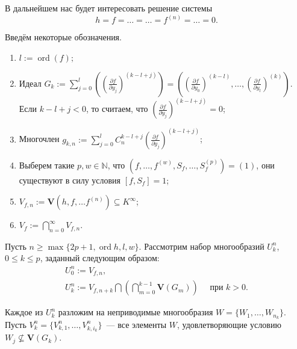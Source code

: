 \documentclass[16pt]{article}
\DeclareMathOperator{\ord}{ord}
\renewcommand{\le}{\leqslant} %
\renewcommand{\ge}{\geqslant} %
\theoremstyle{plain1}
\theoremstyle{plain2}
\theoremstyle{plain}
\theoremstyle{plain3}
\theoremstyle{definition}
\theoremstyle{remark}
\begin{document}
В дальнейшем нас будет интересовать решение системы
\begin{equation}
\label{eq1}
h=f=\ldots=\ldots=f^{(n)}=\ldots=0.
\end{equation}

Введём некоторые обозначения.
\begin{enumerate}

  \item $l:=\ord (f);$

  \item Идеал $G_k := \sum\limits_{j=0}^l\left(\left(\frac{\partial f}{\partial y_j}\right)^{(k-l+j)}\right) = \left(\left(\frac{\partial f}{\partial y_0}\right)^{(k-l)},\ldots ,\left(\frac{\partial f}{\partial y_l}\right)^{(k)} \right)$.
  \\Если $k-l+j<0$, то считаем, что $\left(\frac{\partial f}{\partial y_j}\right)^{(k-l+j)} = 0$;

  \item Многочлен $g_{k,n}:=\sum\limits_{j=0}^{l}C_n^{k-l+j}\left(\frac{\partial f}{\partial y_j}\right)^{(k-l+j)}$;

  \item Выберем  такие $p,w\in \mathbb{N}$, что $\left(f,\ldots,f^{(w)},S_f,\ldots,S_f^{(p)}\right)=(1)$, они существуют в силу условия
  $[f,S_f]=1$;

  \item ${V}_{f,n}:=\mathbf{V}\left(h,f,\ldots f^{(n)}\right)\subseteq K^{\infty}$;

  \item
  ${V}_{f}:=\bigcap\limits_{n=0}^{\infty}V_{f,n}$.

\end{enumerate}



Пусть $n \ge\max\{ 2p+1,\ord{h},l,w\}$. Рассмотрим набор многообразий ${U}_k^n$, $0\le k\le p$, заданный следующим образом:
\begin{gather*}
{U}_{0}^n:={V}_{f,n},\\
{U}_k^n:={V}_{f,n+k}\bigcap\left(\bigcap\limits_{m=0}^{k-1}\mathbf{V}\left(G_m\right)\right) \quad \text{ при } k>0.
\end{gather*}

Каждое из ${U}^n_k$ разложим на неприводимые многообразия $W=\{{W}_{1},\ldots,{W}_{n_k}\}$. Пусть $V^n_k=\{{V}^n_{k,1},\ldots,{V}^n_{k,i_k}\}$~--- все элементы $W$, удовлетворяющие условию ${W}_{j}\not\subseteq\mathbf{V}(G_k)$.
\end{document}
